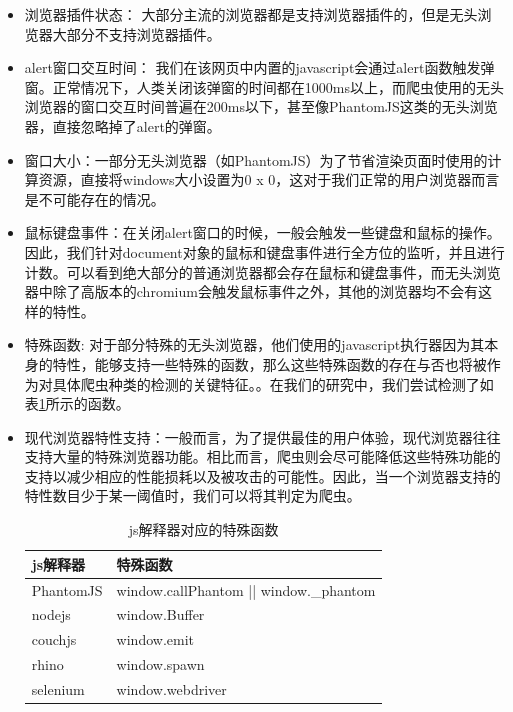 \documentclass[doctor,privacy,twoside]{buaa_mac}
\begin{document}
\begin{itemize}
\item[(1)] 浏览器插件状态： 大部分主流的浏览器都是支持浏览器插件的，但是无头浏览器大部分不支持浏览器插件。
\item[(2)] alert窗口交互时间： 我们在该网页中内置的javascript会通过alert函数触发弹窗。正常情况下，人类关闭该弹窗的时间都在1000ms以上，而爬虫使用的无头浏览器的窗口交互时间普遍在200ms以下，甚至像PhantomJS这类的无头浏览器，直接忽略掉了alert的弹窗。
\item[(3)] 窗口大小：一部分无头浏览器（如PhantomJS）为了节省渲染页面时使用的计算资源，直接将windows大小设置为0 x 0，这对于我们正常的用户浏览器而言是不可能存在的情况。
\item[(4)] 鼠标键盘事件：在关闭alert窗口的时候，一般会触发一些键盘和鼠标的操作。因此，我们针对document对象的鼠标和键盘事件进行全方位的监听，并且进行计数。可以看到绝大部分的普通浏览器都会存在鼠标和键盘事件，而无头浏览器中除了高版本的chromium会触发鼠标事件之外，其他的浏览器均不会有这样的特性。
\item[(5)] 特殊函数: 对于部分特殊的无头浏览器，他们使用的javascript执行器因为其本身的特性，能够支持一些特殊的函数，那么这些特殊函数的存在与否也将被作为对具体爬虫种类的检测的关键特征。。在我们的研究中，我们尝试检测了如表\ref{tab:special-function}所示的函数。
\item[(6)] 现代浏览器特性支持：一般而言，为了提供最佳的用户体验，现代浏览器往往支持大量的特殊浏览器功能。相比而言，爬虫则会尽可能降低这些特殊功能的支持以减少相应的性能损耗以及被攻击的可能性。因此，当一个浏览器支持的特性数目少于某一阈值时，我们可以将其判定为爬虫。


\centerline{}
\begin{table}[h]
  \caption{js解释器对应的特殊函数}
  \label{tab:special-function}
  \centering
\begin{tabular}{|p{3cm}<{\centering}|p{8cm}<{\centering}|}
    \hline
   js解释器 &  特殊函数   \\
    \hline
PhantomJS &  window.callPhantom || window.\_{}phantom \\
\hline
nodejs & window.Buffer \\
\hline
couchjs & window.emit  \\
\hline
rhino & window.spawn \\
\hline
selenium & window.webdriver \\
\hline
    \end{tabular}
\end{table}

\end{itemize}
\end{document}
